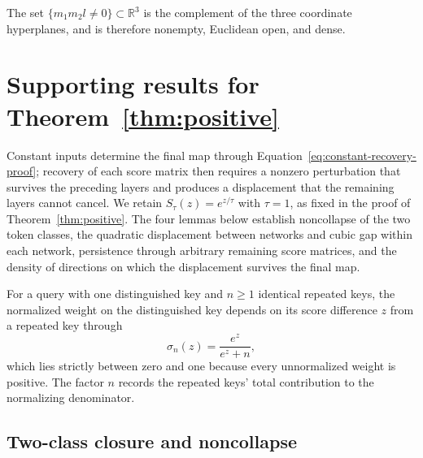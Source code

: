 \documentclass[mlmain]{jmlr}
\newcommand{\R}{\mathbb{R}}
\begin{document}
The set $\{m_1m_2l\ne0\}\subset\R^3$ is the complement of the three
coordinate hyperplanes, and is therefore nonempty, Euclidean open, and
dense.

\section{Supporting results for Theorem~\ref{thm:positive}}
\label{app:asymptotics}

Constant inputs determine the final map through
Equation~\eqref{eq:constant-recovery-proof}; recovery of each score matrix
then requires a nonzero perturbation that survives the preceding layers and
produces a displacement that the remaining layers cannot cancel.  We retain
$S_\tau(z)=e^{z/\tau}$ with $\tau=1$, as fixed in the proof of
Theorem~\ref{thm:positive}.  The four lemmas below establish noncollapse of
the two token classes, the quadratic displacement between networks and cubic
gap within each network, persistence through arbitrary remaining score
matrices, and the density of directions on which the displacement survives
the final map.

For a query with one distinguished key and $n\ge1$ identical repeated keys,
the normalized weight on the distinguished key depends on its score
difference $z$ from a repeated key through
\begin{equation}
 \sigma_n(z)=\frac{e^z}{e^z+n},
 \label{eq:weighted-sigmoid}
\end{equation}
which lies strictly between zero and one because every unnormalized weight
is positive.  The factor $n$ records the repeated keys' total contribution
to the normalizing denominator.

\subsection{Two-class closure and noncollapse}
\end{document}
